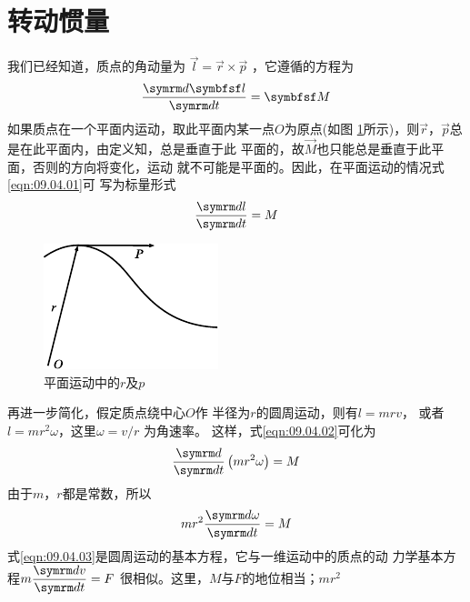 \section[转动惯量]{转\hspace{0.333em}动\hspace{0.333em}惯\hspace{0.333em}量}\label{sec:09.04}

我们已经知道，质点的角动量为 $ \vec{ l } = \vec{ r } \times  \vec{ p }$  ，它遵循的方程为
\begin{equation}\label{eqn:09.04.01}
  \frac { \dif \vec{l} } { \dif t } = \vec{M}
\end{equation}
如果质点在一个平面内运动，取此平面内某一点$ O $为原点(如图
\ref{fig:09.10}所示)，则$ \vec{ r } $，$ \vec{ p } $总是在此平面内，由定义知，总是垂直于此
平面的，故$ \vec{M} $也只能总是垂直于此平面，否则的方向将变化，运动
\clearpage\noindent
就不可能是平面的。因此，在平面运动的情况\lhbrak  式\eqref{eqn:09.04.01}\rhbrak 可
写为标量形式
\begin{equation}\label{eqn:09.04.02}
  \frac { \dif l } { \dif t } = M
\end{equation}
\begin{figure}
    \centering
    \includegraphics{figure/fig09.10}
    \caption{平面运动中的$ r $及$ p $}
    \label{fig:09.10}
\end{figure}
再进一步简化，假定质点绕中心$ O $作
半径为$ r $的圆周运动，则有$  l = m r v   $，
或者$  l = m r ^ { 2 } \omega   $，这里$  \omega = v / r $ 为角速率。
这样，式\eqref{eqn:09.04.02}可化为
\begin{equation*}
  \frac { \dif } { \dif t } \left( m r ^ { 2 } \omega \right) = M
\end{equation*}
由于$ m $，$ r $都是常数，所以
\begin{equation}\label{eqn:09.04.03}
  m r ^ { 2 } \frac { \dif \omega } { \dif t } = M
\end{equation}
式\eqref{eqn:09.04.03}是圆周运动的基本方程，它与一维运动中的质点的动
力学基本方程$ m \dfrac { \dif v } { \dif t } = F $ 很相似。这里，$ M $与$ F $的地位相当；$ m r ^ 2 $

